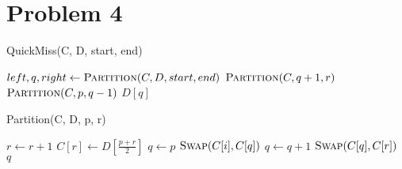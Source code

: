 \documentclass[11pt]{article}
\begin{document}
\section{Problem 4}

\begin{algorithm}
\caption{QuickMiss(C, D, start, end)}\label{QuickMiss}
    \begin{algorithmic}[1]
            \State $left, q, right \gets \textsc{Partition}(C, D, start, end)$
                \State $\textsc{Partition}(C, q+1, r)$
                \State $\textsc{Partition}(C, p, q-1)$
            \Else
                \State \Return $D[q]$
            \EndIf
        \EndIf
        \EndProcedure
    \end{algorithmic}
\end{algorithm}


\begin{algorithm}
\caption{Partition(C, D, p, r)}\label{Partition}
    \begin{algorithmic}[1]
        \State $r \gets r+1$
        \State $C[r] \gets D[\frac{p+r}{2}]$
        \State $q \gets p$
                \State $\textsc{Swap}(C[i], C[q])$
                \State $q \gets q+1$
            \EndIf
        \EndFor
        \State $\textsc{Swap}(C[q], C[r])$
        \State \Return $q$
        \EndProcedure
    \end{algorithmic}
\end{algorithm}

%
% 
% 
\end{document}
